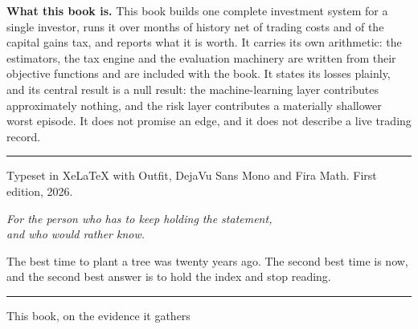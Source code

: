 \noindent\textbf{What this book is.} This book builds one complete
investment system for a single investor, runs it over
\numRecordMonths{} months of history net of trading costs and of the
capital gains tax, and reports what it is worth. It carries its own
arithmetic: the estimators, the tax engine and the evaluation machinery
are written from their objective functions and are included with the
book. It states its losses plainly, and its central result is a null
result: the machine-learning layer contributes approximately nothing, and
the risk layer contributes a materially shallower worst episode. It does
not promise an edge, and it does not describe a live trading record.\par
\vspace{10pt}
\noindent\rule{\textwidth}{0.4pt}\par
\vspace{8pt}
{\sffamily\small\color{txtdim}Typeset in XeLaTeX with Outfit, DejaVu Sans Mono
and Fira Math. First edition, 2026.\par}
\clearpage

\clearpage
\thispagestyle{empty}
\vspace*{2.6in}
\begin{center}
{\sffamily\itshape\color{txtdim}
For the person who has to keep holding the statement,\\[6pt]
and who would rather know.\par}
\end{center}
\vfill
\clearpage

\clearpage
\thispagestyle{plain}
\begin{epigraph}
The best time to plant a tree was twenty years ago. The second best time
is now, and the second best answer is to hold the index and stop reading.

\rule{1.6in}{0.3pt}

This book, on the evidence it gathers
\end{epigraph}
\vfill
\clearpage

\clearpage
\thispagestyle{plain}
\tableofcontents
{}
\clearpage

\clearpage
\thispagestyle{plain}
\listoffigures
{}
\clearpage

